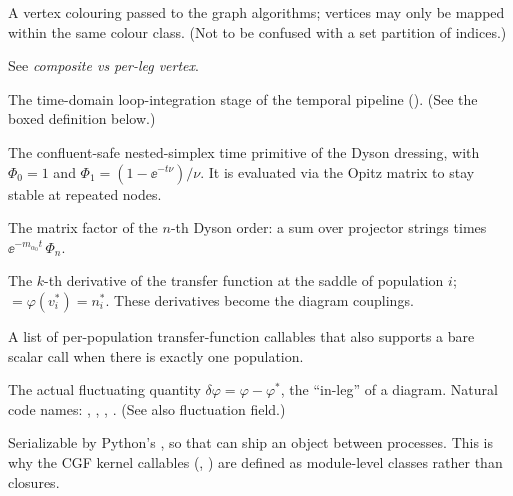 \begin{description}[leftmargin=0pt,style=nextline]

  \item[Partition (\code{nauty}/Sage sense)] A vertex colouring passed to the graph
        algorithms; vertices may only be mapped within the same colour class. (Not to
        be confused with a set partition of indices.)

  \item[Per-leg vs composite] See \emph{composite vs per-leg vertex}.

  \item[Phase J] The time-domain loop-integration stage of the temporal pipeline
        (). (See the boxed definition below.)

  \item[$\Phi_n(t;\nu)$] The confluent-safe nested-simplex time primitive of the
        Dyson dressing, with $\Phi_0=1$ and $\Phi_1=(1-\ee^{-t\nu})/\nu$. It is
        evaluated via the Opitz matrix to stay stable at repeated nodes.

  \item[$\mathcal{H}_n(t)$] The matrix factor of the $n$-th Dyson order: a sum over
        projector strings times $\ee^{-m_{\alpha_0}t}\,\Phi_n$.

  \item[$\varphi^{(k)}$ / \code{phik\_i}] The $k$-th derivative of the transfer
        function at the saddle of population $i$; 
        $=\varphi(v^{*}_i)=n^{*}_i$. These derivatives become the diagram couplings.

  \item[\code{\_PhiCallableList}] A list of per-population transfer-function
        callables that also supports a bare scalar call  when there is
        exactly one population.

  \item[Physical (fluctuation) field] The actual fluctuating quantity
        $\delta\varphi=\varphi-\varphi^{*}$, the ``in-leg'' of a diagram. Natural code
        names: , , , . (See also fluctuation field.)

  \item[Picklable] Serializable by Python's , so that
         can ship an object between processes. This is why the
        CGF kernel callables (, ) are
        defined as module-level classes rather than closures.


\end{description}

